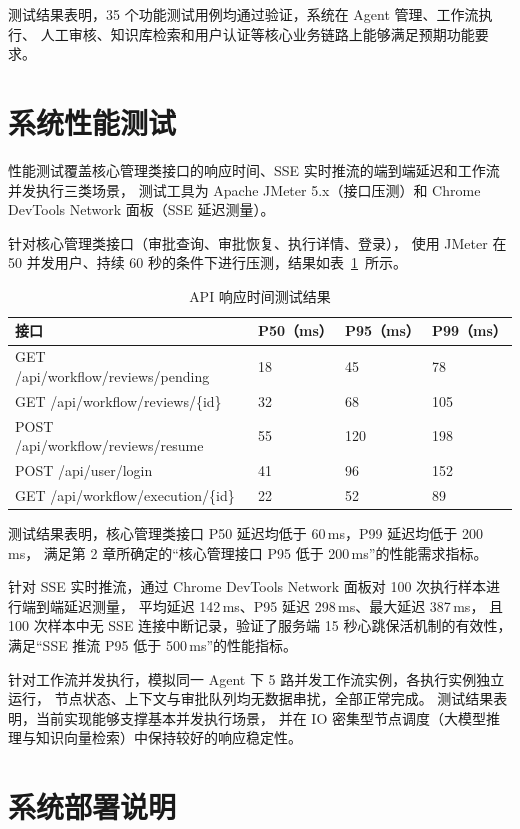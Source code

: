 测试结果表明，35 个功能测试用例均通过验证，系统在 Agent 管理、工作流执行、
人工审核、知识库检索和用户认证等核心业务链路上能够满足预期功能要求。

\section{系统性能测试}

性能测试覆盖核心管理类接口的响应时间、SSE 实时推流的端到端延迟和工作流并发执行三类场景，
测试工具为 Apache JMeter 5.x（接口压测）和 Chrome DevTools Network 面板（SSE 延迟测量）。

针对核心管理类接口（审批查询、审批恢复、执行详情、登录），
使用 JMeter 在 50 并发用户、持续 60 秒的条件下进行压测，结果如表~\ref{tab:perf_api}~所示。

\begin{table}[H]
  \centering
  \caption{API 响应时间测试结果}
  \begin{tabular}{llll}
    \toprule
    接口 & P50（ms） & P95（ms） & P99（ms） \\
    \midrule
    GET /api/workflow/reviews/pending & 18 & 45 & 78 \\
    GET /api/workflow/reviews/\{id\} & 32 & 68 & 105 \\
    POST /api/workflow/reviews/resume & 55 & 120 & 198 \\
    POST /api/user/login & 41 & 96 & 152 \\
    GET /api/workflow/execution/\{id\} & 22 & 52 & 89 \\
    \bottomrule
  \end{tabular}
  \label{tab:perf_api}
\end{table}

测试结果表明，核心管理类接口 P50 延迟均低于 60\,ms，P99 延迟均低于 200\,ms，
满足第 2 章所确定的“核心管理接口 P95 低于 200\,ms”的性能需求指标。

针对 SSE 实时推流，通过 Chrome DevTools Network 面板对 100 次执行样本进行端到端延迟测量，
平均延迟 142\,ms、P95 延迟 298\,ms、最大延迟 387\,ms，
且 100 次样本中无 SSE 连接中断记录，验证了服务端 15 秒心跳保活机制的有效性，
满足“SSE 推流 P95 低于 500\,ms”的性能指标。

针对工作流并发执行，模拟同一 Agent 下 5 路并发工作流实例，各执行实例独立运行，
节点状态、上下文与审批队列均无数据串扰，全部正常完成。
测试结果表明，当前实现能够支撑基本并发执行场景，
并在 IO 密集型节点调度（大模型推理与知识向量检索）中保持较好的响应稳定性。

\section{系统部署说明}

